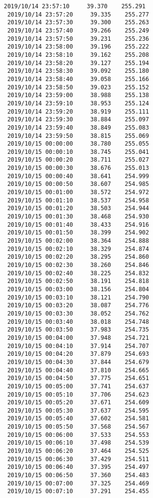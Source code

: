 \documentclass[11pt]{article}
\begin{document}
\begin{Verbatim}[commandchars=\\\{\}]
 2019/10/14 23:57:10     39.370    255.291
 2019/10/14 23:57:20     39.335    255.277
 2019/10/14 23:57:30     39.300    255.263
 2019/10/14 23:57:40     39.266    255.249
 2019/10/14 23:57:50     39.231    255.236
 2019/10/14 23:58:00     39.196    255.222
 2019/10/14 23:58:10     39.162    255.208
 2019/10/14 23:58:20     39.127    255.194
 2019/10/14 23:58:30     39.092    255.180
 2019/10/14 23:58:40     39.058    255.166
 2019/10/14 23:58:50     39.023    255.152
 2019/10/14 23:59:00     38.988    255.138
 2019/10/14 23:59:10     38.953    255.124
 2019/10/14 23:59:20     38.919    255.111
 2019/10/14 23:59:30     38.884    255.097
 2019/10/14 23:59:40     38.849    255.083
 2019/10/14 23:59:50     38.815    255.069
 2019/10/15 00:00:00     38.780    255.055
 2019/10/15 00:00:10     38.745    255.041
 2019/10/15 00:00:20     38.711    255.027
 2019/10/15 00:00:30     38.676    255.013
 2019/10/15 00:00:40     38.641    254.999
 2019/10/15 00:00:50     38.607    254.985
 2019/10/15 00:01:00     38.572    254.972
 2019/10/15 00:01:10     38.537    254.958
 2019/10/15 00:01:20     38.503    254.944
 2019/10/15 00:01:30     38.468    254.930
 2019/10/15 00:01:40     38.433    254.916
 2019/10/15 00:01:50     38.399    254.902
 2019/10/15 00:02:00     38.364    254.888
 2019/10/15 00:02:10     38.329    254.874
 2019/10/15 00:02:20     38.295    254.860
 2019/10/15 00:02:30     38.260    254.846
 2019/10/15 00:02:40     38.225    254.832
 2019/10/15 00:02:50     38.191    254.818
 2019/10/15 00:03:00     38.156    254.804
 2019/10/15 00:03:10     38.121    254.790
 2019/10/15 00:03:20     38.087    254.776
 2019/10/15 00:03:30     38.052    254.762
 2019/10/15 00:03:40     38.018    254.748
 2019/10/15 00:03:50     37.983    254.735
 2019/10/15 00:04:00     37.948    254.721
 2019/10/15 00:04:10     37.914    254.707
 2019/10/15 00:04:20     37.879    254.693
 2019/10/15 00:04:30     37.844    254.679
 2019/10/15 00:04:40     37.810    254.665
 2019/10/15 00:04:50     37.775    254.651
 2019/10/15 00:05:00     37.741    254.637
 2019/10/15 00:05:10     37.706    254.623
 2019/10/15 00:05:20     37.671    254.609
 2019/10/15 00:05:30     37.637    254.595
 2019/10/15 00:05:40     37.602    254.581
 2019/10/15 00:05:50     37.568    254.567
 2019/10/15 00:06:00     37.533    254.553
 2019/10/15 00:06:10     37.498    254.539
 2019/10/15 00:06:20     37.464    254.525
 2019/10/15 00:06:30     37.429    254.511
 2019/10/15 00:06:40     37.395    254.497
 2019/10/15 00:06:50     37.360    254.483
 2019/10/15 00:07:00     37.325    254.469
 2019/10/15 00:07:10     37.291    254.455

\end{Verbatim}
\end{document}
